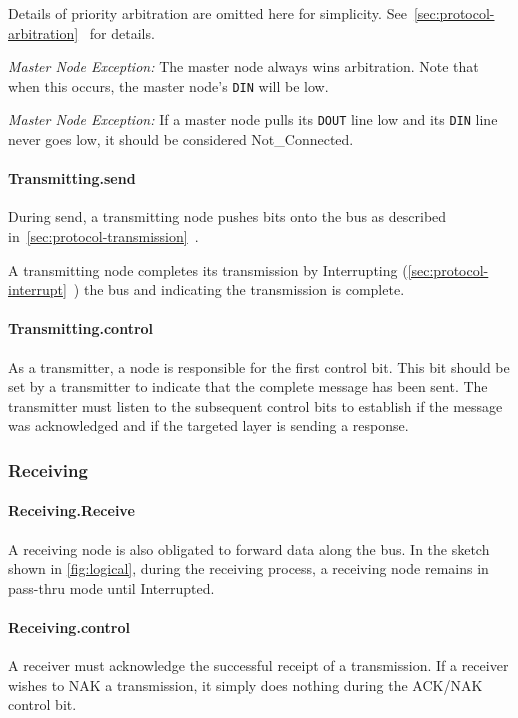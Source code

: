 Details of priority arbitration are omitted here for simplicity.
See~\ref{sec:protocol-arbitration}~ for
details.

\medskip
\noindent
{\em Master Node Exception:} The master node always wins arbitration. Note
that when this occurs, the master node's {\tt DIN} will be low.

\medskip
\noindent
{\em Master Node Exception:} If a master node pulls its {\tt DOUT} line low
and its {\tt DIN} line never goes low, it should be considered
{\sc Not\_Connected}.

\paragraph{Transmitting.{\sc send}}
During {\sc send}, a transmitting node pushes bits onto the bus as described
in~\ref{sec:protocol-transmission}~.

A transmitting node completes its transmission by Interrupting
(\ref{sec:protocol-interrupt}~) the bus and
indicating the transmission is complete.

\paragraph{Transmitting.{\sc control}}
As a transmitter, a node is responsible for the first control bit. This bit
should be set by a transmitter to indicate that the complete message has been
sent. The transmitter must listen to the subsequent control bits to establish
if the message was acknowledged and if the targeted layer is sending a
response.

\subsubsection{Receiving}

\paragraph{Receiving.{\sc Receive}}
A receiving node is also obligated to forward data along the bus. In the
sketch shown in \cref{fig:logical}, during the receiving process, a
receiving node remains in pass-thru mode until Interrupted.

\paragraph{Receiving.{\sc control}}
A receiver must acknowledge the successful receipt of a transmission. If a
receiver wishes to NAK a transmission, it simply does nothing during the
ACK/NAK control bit.

